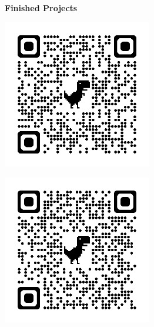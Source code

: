 \documentclass[letterpaper,10pt]{article}
\newcommand{\qrheader}[1]{
  \begin{center}
    \vspace{0.5cm}
    \textbf{#1}
  \end{center}
}
\begin{document}
  \begin{center}
    \qrheader{Finished Projects}
    \begin{minipage}{0.45\textwidth}
        \centering
        \includegraphics[width=6.5cm, height=6.5cm]{Figures/STM32.png}
        \label{fig:image3}
    \end{minipage}
    \hspace{0.05\textwidth}
    \begin{minipage}{0.45\textwidth}
        \centering
        \includegraphics[width=6.5cm, height=6.5cm]{Figures/CustomCane.png}
        \label{fig:image4}
    \end{minipage}
    \vspace{0.1cm} %
  \end{center}
  
\end{document}

